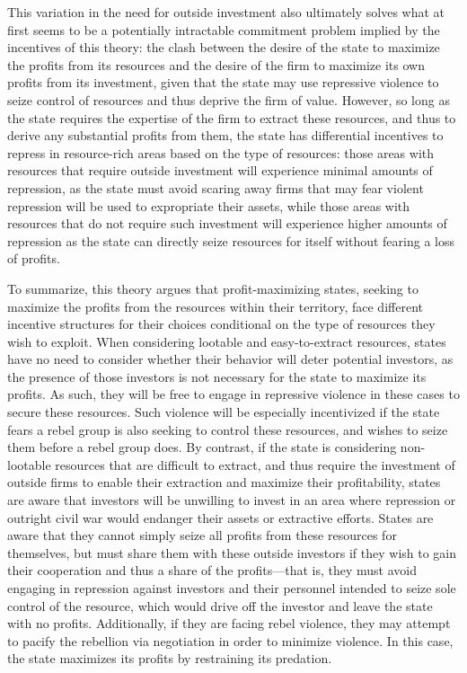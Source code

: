 This variation in the need for outside investment also ultimately solves what at first seems to be a potentially intractable commitment problem implied by the incentives of this theory: the clash between the desire of the state to maximize the profits from its resources and the desire of the firm to maximize its own profits from its investment, given that the state may use repressive violence to seize control of resources and thus deprive the firm of value. However, so long as the state requires the expertise of the firm to extract these resources, and thus to derive any substantial profits from them, the state has differential incentives to repress in resource-rich areas based on the type of resources: those areas with resources that require outside investment will experience minimal amounts of repression, as the state must avoid scaring away firms that may fear violent repression will be used to expropriate their assets, while those areas with resources that do not require such investment will experience higher amounts of repression as the state can directly seize resources for itself without fearing a loss of profits.

To summarize, this theory argues that profit-maximizing states, seeking to maximize the profits from the resources within their territory, face different incentive structures for their choices conditional on the type of resources they wish to exploit. When considering lootable and easy-to-extract resources, states have no need to consider whether their behavior will deter potential investors, as the presence of those investors is not necessary for the state to maximize its profits. As such, they will be free to engage in repressive violence in these cases to secure these resources. Such violence will be especially incentivized if the state fears a rebel group is also seeking to control these resources, and wishes to seize them before a rebel group does. By contrast, if the state is considering non-lootable resources that are difficult to extract, and thus require the investment of outside firms to enable their extraction and maximize their profitability, states are aware that investors will be unwilling to invest in an area where repression or outright civil war would endanger their assets or extractive efforts. States are aware that they cannot simply seize all profits from these resources for themselves, but must share them with these outside investors if they wish to gain their cooperation and thus a share of the profits—that is, they must avoid engaging in repression against investors and their personnel intended to seize sole control of the resource, which would drive off the investor and leave the state with no profits. Additionally, if they are facing rebel violence, they may attempt to pacify the rebellion via negotiation in order to minimize violence. In this case, the state maximizes its profits by restraining its predation. 

